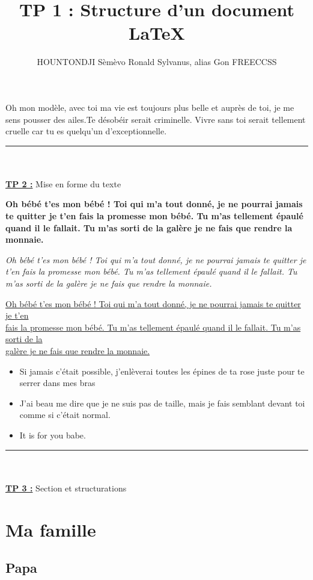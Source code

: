 \documentclass[12pt,a4paper,oneside]{article}
\author{HOUNTONDJI Sèmèvo Ronald Sylvanus, alias Gon FREECCSS}
\title{TP 1 : Structure d'un document LaTeX}
\begin{document}
\maketitle
\par Oh mon modèle, avec toi ma vie est toujours plus belle et auprès de toi, je me sens pousser des ailes.Te désobéir serait criminelle.  Vivre sans toi serait tellement cruelle car tu es quelqu'un d'exceptionnelle. \\
\rule{16cm}{1pt} \\ \\
{\Large \underline{\textbf{TP 2 :}} Mise en forme du texte} \\ 
\par \textbf{Oh bébé t'es mon bébé ! Toi qui m'a tout donné, je ne pourrai jamais te quitter je t'en fais la promesse mon bébé. Tu m'as tellement épaulé quand il le fallait. Tu m'as sorti de la galère je ne fais que rendre la monnaie.} \\
\par \textit{Oh bébé t'es mon bébé ! Toi qui m'a tout donné, je ne pourrai jamais te quitter je t'en fais la promesse mon bébé. Tu m'as tellement épaulé quand il le fallait. Tu m'as sorti de la galère je ne fais que rendre la monnaie.} \\ 
\par \underline{Oh bébé t'es mon bébé ! Toi qui m'a tout donné, je ne pourrai jamais te quitter je t'en} \\ \underline{fais la promesse mon bébé. Tu m'as tellement épaulé quand il le fallait. Tu m'as sorti de la} \\ \underline{galère je ne fais que rendre la monnaie.}
\begin{itemize}
\item Si jamais c'était possible, j'enlèverai toutes les épines de ta rose juste pour te serrer dans mes bras
\item J'ai beau me dire que je ne suis pas de taille, mais je fais semblant devant toi comme si c'était normal.
\item It is for you babe.
\end{itemize}

\rule{16cm}{1pt} \\ \\
{\Large \underline{\textbf{TP 3 :}} Section et structurations} 
\section{Ma famille}
\subsection{Papa}
\end{document}
